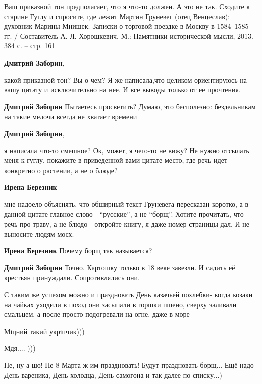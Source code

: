 \begin{itemize}
\begin{itemize}
Ваш приказной тон предполагает, что я что-то должен. А это не так. Сходите к
старине Гуглу и спросите, где лежит Мартин Груневег (отец Венцеслав): духовник
Марины Мнишек: Записки о торговой поездке в Москву в 1584–1585 гг. /
Составитель А. Л. Хорошкевич. М.: Памятники исторической мысли, 2013. - 384 с.
– стр. 161

\textbf{Дмитрий Заборин}, 

какой приказной тон? Вы о чем? Я же написала,что целиком ориентируюсь на вашу
цитату и исключительно на нее. И все выводы только от ее прочтения.

\textbf{Дмитрий Заборин} Пытаетесь просветить? Думаю, это бесполезно: бездельникам на такие мелочи всегда не хватает времени

\textbf{Дмитрий Заборин},

я написала что-то смешное? Ок, может, я чего-то не вижу? Не нужно отсылать меня к
гуглу, покажите в приведенной вами цитате место, где речь идет конкретно о
растении, а не о блюде?



\textbf{Ирена Березник} 

мне надоело объяснять, что обширный текст Груневега пересказан коротко, а в
данной цитате главное слово - \enquote{русские}, а не \enquote{борщ}. Хотите прочитать, что
речь про траву, а не блюдо - откройте книгу, я даже номер страницы дал. И не
выносите людям мосх.

\textbf{Ирена Березник} Почему борщ так называется?

\textbf{Дмитрий Заборин} Точно. Картошку только в 18 веке завезли. И садить её крестьян принуждали. Сопротивлялись они.
\end{itemize} %


С таким же успехом можно и праздновать День казачьей похлебки- когда козаки на
чайках уходили в поход они засыпали в горшки пшено, сверху заливали смальцем, а
после просто подогревали на огне, даже в море


Мiцний такий укрiпчик)))

Мдя.... )))

Не, ну а шо!
Не 8 Марта ж им праздновать! Будут праздновать борщ... Ещё надо День вареника, День холодца, День самогона и так далее по списку...)


\end{itemize}
